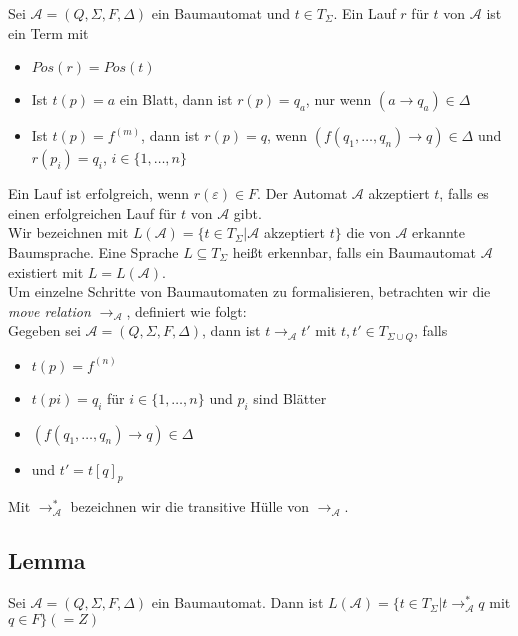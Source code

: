 \documentclass[titlepage]{article}
\begin{document}
Sei $\mathcal{A} = (Q, \Sigma, F, \Delta)$ ein Baumautomat und $t\in T_{\Sigma}$. 
Ein Lauf $r$ f\"ur $t$ von $\mathcal{A}$ ist ein Term mit

\begin{itemize}
    \item $Pos(r) = Pos(t)$
    \item Ist $t(p) = a$ ein Blatt, dann ist $r(p) = q_a$, nur wenn 
        $(a\rightarrow q_a) \in \Delta$ 
    \item Ist $t(p)=f^{(m)}$, dann ist $r(p) = q$, wenn 
        $(f(q_1, \dots, q_n) \rightarrow q) \in \Delta$ und 
        $r(p_i) = q_i$, $i \in \{1, \dots, n\}$
\end{itemize}

Ein Lauf ist erfolgreich, wenn $r(\varepsilon) \in F$. 
Der Automat $\mathcal{A}$ akzeptiert $t$, falls es einen erfolgreichen Lauf
f\"ur $t$ von $\mathcal{A}$ gibt.\\
Wir bezeichnen mit $L(\mathcal{A}) = \{t \in T_{\Sigma} | \mathcal{A}$ akzeptiert $t\}$ 
die von $\mathcal{A}$ erkannte Baumsprache. 
Eine Sprache $L \subseteq T_{\Sigma}$ hei\ss t erkennbar, falls ein Baumautomat 
$\mathcal{A}$ existiert mit $L=L(\mathcal{A})$.\\

Um einzelne Schritte von Baumautomaten zu formalisieren, betrachten wir die 
\textit{move relation} $\rightarrow_{\mathcal{A}}$, 
definiert wie folgt:\\
Gegeben sei $\mathcal{A} = (Q, \Sigma, F, \Delta)$, dann ist 
$t \rightarrow _{\mathcal{A}} t'$ mit $t, t' \in T_{\Sigma \cup Q}$, falls

\begin{itemize}
    \item $t(p) = f^{(n)}$
    \item $t(pi) = q_i$ f\"ur $i \in \{1, \dots, n\}$ und $p_i$ sind Bl\"atter
    \item $(f(q_1, \dots, q_n) \rightarrow q) \in \Delta$
    \item und $t' = t[q]_p$
\end{itemize}

Mit $\rightarrow^\ast_{\mathcal{A}}$ bezeichnen wir die transitive H\"ulle von 
$\rightarrow_{\mathcal{A}}$.

\subsection{Lemma}

Sei $\mathcal{A} = (Q, \Sigma, F, \Delta)$ ein Baumautomat. Dann ist 
$L(\mathcal{A}) = \{t \in T_{\Sigma} | t \rightarrow^\ast_{\mathcal{A}} q$ mit 
$q \in F\} (=Z)$\\
\end{document}
